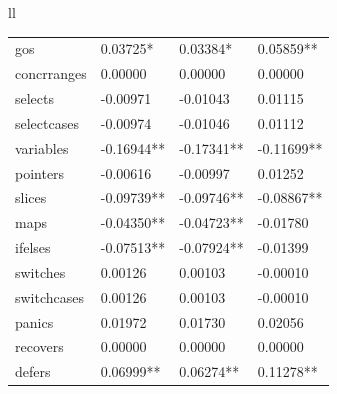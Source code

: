 \documentclass{seal_thesis}
\begin{document}
\begin{table}[H]
\begin{tabular}{ll}
{\begin{tabular}{llll}
		gos & \cellcolor[HTML]{3366FF}0.03725* & \cellcolor[HTML]{3366FF}0.03384* & \cellcolor[HTML]{3366FF}0.05859** \\
		concrranges & \cellcolor[HTML]{333399}\color{white}0.00000 & \cellcolor[HTML]{333399}\color{white}0.00000 & \cellcolor[HTML]{333399}\color{white}0.00000 \\
		selects & \cellcolor[HTML]{333399}\color{white}-0.00971 & \cellcolor[HTML]{333399}\color{white}-0.01043 & \cellcolor[HTML]{333399}\color{white}0.01115 \\
		selectcases & \cellcolor[HTML]{333399}\color{white}-0.00974 & \cellcolor[HTML]{333399}\color{white}-0.01046 & \cellcolor[HTML]{333399}\color{white}0.01112 \\
		variables & \cellcolor[HTML]{333399}\color{white}-0.16944** & \cellcolor[HTML]{333399}\color{white}-0.17341** & \cellcolor[HTML]{333399}\color{white}-0.11699** \\
		pointers & \cellcolor[HTML]{333399}\color{white}-0.00616 & \cellcolor[HTML]{333399}\color{white}-0.00997 & \cellcolor[HTML]{333399}\color{white}0.01252 \\
		slices & \cellcolor[HTML]{333399}\color{white}-0.09739** & \cellcolor[HTML]{333399}\color{white}-0.09746** & \cellcolor[HTML]{333399}\color{white}-0.08867** \\
		maps & \cellcolor[HTML]{333399}\color{white}-0.04350** & \cellcolor[HTML]{333399}\color{white}-0.04723** & \cellcolor[HTML]{333399}\color{white}-0.01780 \\
		ifelses & \cellcolor[HTML]{333399}\color{white}-0.07513** & \cellcolor[HTML]{333399}\color{white}-0.07924** & \cellcolor[HTML]{333399}\color{white}-0.01399 \\
		switches & \cellcolor[HTML]{333399}\color{white}0.00126 & \cellcolor[HTML]{333399}\color{white}0.00103 & \cellcolor[HTML]{333399}\color{white}-0.00010 \\
		switchcases & \cellcolor[HTML]{333399}\color{white}0.00126 & \cellcolor[HTML]{333399}\color{white}0.00103 & \cellcolor[HTML]{333399}\color{white}-0.00010 \\
		panics & \cellcolor[HTML]{3366FF}0.01972 & \cellcolor[HTML]{333399}\color{white}0.01730 & \cellcolor[HTML]{3366FF}0.02056 \\
		recovers & \cellcolor[HTML]{333399}\color{white}0.00000 & \cellcolor[HTML]{333399}\color{white}0.00000 & \cellcolor[HTML]{333399}\color{white}0.00000 \\
		defers & \cellcolor[HTML]{3366FF}0.06999** & \cellcolor[HTML]{3366FF}0.06274** & \cellcolor[HTML]{99CCFF}0.11278** \\

\end{tabular}}
\end{tabular}
\end{table}
\end{document}
